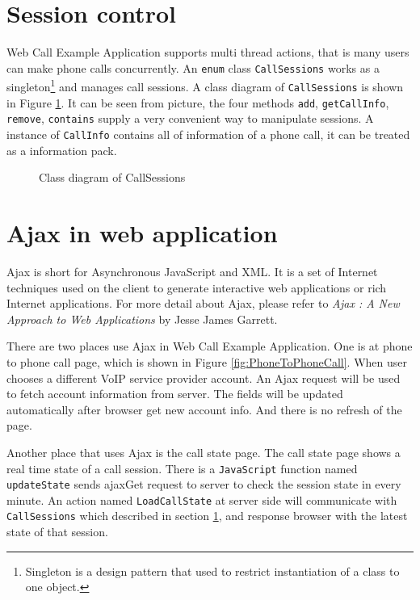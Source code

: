 \section{Session control}
\label{sec:WebApplication:SessionControl}

Web Call Example Application supports multi thread actions, that is many users can make phone calls concurrently. An \texttt{enum} class \texttt{CallSessions} works as a singleton\footnote{Singleton is a design pattern that used to restrict instantiation of a class to one object.} and manages call sessions. A class diagram of \texttt{CallSessions} is shown in Figure \ref{fig:ClassDiagramOfCallSessions}. It can be seen from picture, the four methods \texttt{add}, \texttt{getCallInfo}, \texttt{remove}, \texttt{contains} supply a very convenient way to manipulate sessions. A instance of \texttt{CallInfo} contains all of information of a phone call, it can be treated as a information pack.

\begin{figure}[!hbtp]
\centering
{}
\caption{Class diagram of CallSessions}
\label{fig:ClassDiagramOfCallSessions}
\end{figure} 

\section{Ajax in web application}
\label{sec:WebApplication:AjaxInWebApplication}

Ajax\label{sym:Ajax} is short for Asynchronous JavaScript and XML. It is a set of Internet techniques used on the client to generate interactive web applications or rich Internet applications. For more detail about Ajax, please refer to \textit{Ajax : A New Approach to Web Applications} by Jesse James Garrett\cite{AjaxJesse}.

There are two places use Ajax in Web Call Example Application. One is at phone to phone call page, which is shown in Figure \ref{fig:PhoneToPhoneCall}. When user chooses a different VoIP service provider account. An Ajax request will be used to fetch account information from server. The fields will be updated automatically after browser get new account info. And there is no refresh of the page. 

Another place that uses Ajax is the call state page. The call state page shows a real time state of a call session. There is a \texttt{JavaScript} function named \texttt{updateState} sends ajaxGet request to server to check the session state in every minute. An action named \texttt{LoadCallState} at server side will communicate with \texttt{CallSessions} which described in section \ref{sec:WebApplication:SessionControl}, and response browser with the latest state of that session.

